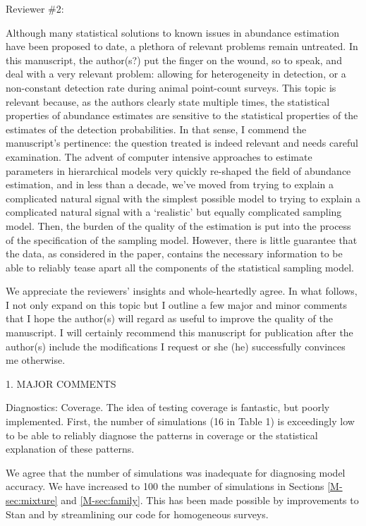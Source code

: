 \documentclass[12pt]{article}
\renewenvironment{quote}  %
              {\list{}{\rightmargin\leftmargin}\normalfont%
               \item\relax}
              {\endlist}
\begin{document}
\newpage



Reviewer \#2:

Although many statistical solutions to known issues in abundance estimation have been proposed to date, a plethora of relevant problems remain untreated.  In this manuscript, the author(s?) put the finger on the wound, so to speak, and deal with a very relevant problem: allowing for heterogeneity in detection, or a non-constant detection rate during animal point-count surveys.  This topic is relevant because, as the authors clearly state multiple times, the statistical properties of abundance estimates are sensitive to the statistical properties of the estimates of the detection probabilities. In that sense, I commend the manuscript's pertinence: the question treated is indeed relevant and needs careful examination.
The advent of computer intensive approaches to estimate parameters in hierarchical models very quickly re-shaped the field of abundance estimation, and in less than a decade, we've moved from trying to explain a complicated natural signal with the simplest possible model to trying to explain a complicated natural signal with a `realistic' but equally complicated sampling model. Then, the burden of the quality of the estimation is put into the process of the specification of the sampling model. However, there is little guarantee that the data, as considered in the paper, contains the necessary information to be able to reliably tease apart all the components of the statistical sampling model. 
\begin{quote}
We appreciate the reviewers' insights and whole-heartedly agree.
\end{quote}
In what follows, I not only expand on this topic but I outline a few major and minor comments that I hope the author(s) will regard as useful to improve the quality of the manuscript. I will certainly recommend this manuscript for publication after the author(s) include the
modifications I request or she (he) successfully convinces me otherwise.



1. MAJOR COMMENTS


Diagnostics: Coverage. The idea of testing coverage is fantastic, but poorly implemented. First, the number of simulations (16 in Table 1) is exceedingly low to be able to reliably diagnose the patterns in coverage or the statistical explanation of these patterns. 
\begin{quote}
We agree that the number of simulations was inadequate for diagnosing model accuracy.
We have increased to 100 the number of simulations in Sections \ref{M-sec:mixture} and \ref{M-sec:family}.
This has been made possible by improvements to Stan \citep{Rstan2016} and by streamlining our code for homogeneous surveys.
\end{quote}
\end{document}
